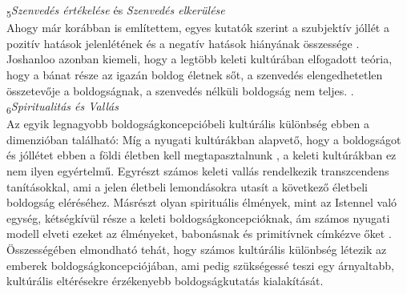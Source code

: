 \textsubscript{5}\textit{Szenvedés értékelése} és \textit{Szenvedés elkerülése}\\
Ahogy már korábban is említettem, egyes kutatók szerint a szubjektív jóllét a pozitív hatások jelenlétének és a negatív hatások hiányának összessége \cite{diener_suh_lucas_smith_1999}. Joshanloo azonban kiemeli, hogy a legtöbb keleti kultúrában elfogadott teória, hogy a bánat része az igazán boldog életnek sőt, a szenvedés elengedhetetlen összetevője a boldogságnak, a szenvedés nélküli boldogság nem teljes. \cite{joshanloo_2013_eastern}.\\
\textsubscript{6}\textit{Spiritualitás és Vallás}\\
Az egyik legnagyobb boldogságkoncepcióbeli kultúrális különbség ebben a dimenzióban található: Míg a nyugati kultúrákban alapvető, hogy a boldogságot és jóllétet ebben a földi életben kell megtapasztalnunk \cite{joshanloo_2013_eastern}, a keleti kultúrákban ez nem ilyen egyértelmű. Egyrészt számos keleti vallás rendelkezik transzcendens tanításokkal, ami a jelen életbeli lemondásokra utasít a következő életbeli boldogság eléréséhez. Másrészt olyan spirituális élmények, mint az Istennel való egység, kétségkívül része a keleti boldogságkoncepcióknak, ám számos nyugati modell elveti ezeket az élményeket, babonásnak és primitívnek címkézve őket \cite{joshanloo_2013_eastern}.\\
Összességében elmondható tehát, hogy számos kultúrális különbség létezik az emberek boldogságkoncepciójában, ami pedig szükségessé teszi egy árnyaltabb, kultúrális eltérésekre érzékenyebb boldogságkutatás kialakítását.













































